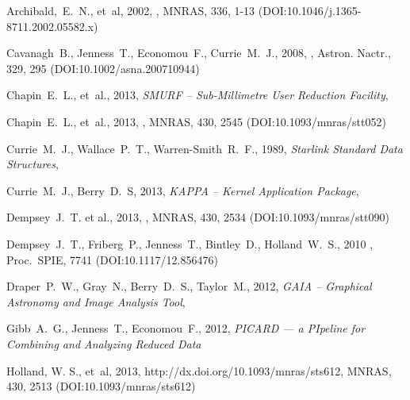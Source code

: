 \documentclass[11pt,oneside,chapters]{starlink}
\begin{document}
\begin{thebibliography}{}

Archibald,~E.~N., et~al, 2002, , MNRAS, 336, 1-13
(DOI:10.1046/j.1365-8711.2002.05582.x)

Cavanagh~B., Jenness~T., Economou~F., Currie~M.~J., 2008,
, Astron. Nactr., 329, 295
(DOI:10.1002/asna.200710944)

Chapin~E.~L., et~al., 2013, \textit{SMURF -- Sub-Millimetre User Reduction
Facility}, 

Chapin~E.~L., et~al., 2013,
,
MNRAS, 430, 2545 (DOI:10.1093/mnras/stt052)

Currie~M.~J., Wallace~P.~T., Warren-Smith~R.~F., 1989,
\textit{Starlink Standard Data Structures}, 

Currie~M.~J., Berry~D.~S, 2013, \textit{KAPPA -- Kernel Application Package},

Dempsey~J.~T. et al., 2013, ,
MNRAS, 430, 2534 (DOI:10.1093/mnras/stt090)

Dempsey~J.~T., Friberg~P., Jenness~T., Bintley~D., Holland~W.~S., 2010
,
Proc.\ SPIE, 7741 (DOI:10.1117/12.856476)

Draper~P.~W., Gray~N., Berry~D.~S., Taylor~M., 2012,
\textit{GAIA -- Graphical Astronomy and Image Analysis Tool},

Gibb~A.~G., Jenness~T., Economou~F., 2012, \textit{PICARD --- a
PIpeline for Combining and Analyzing Reduced Data}

Holland, W. S., et~al, 2013, 
{http://dx.doi.org/10.1093/mnras/sts612}, MNRAS, 430, 2513
(DOI:10.1093/mnras/sts612)


\end{thebibliography}
\end{document}
